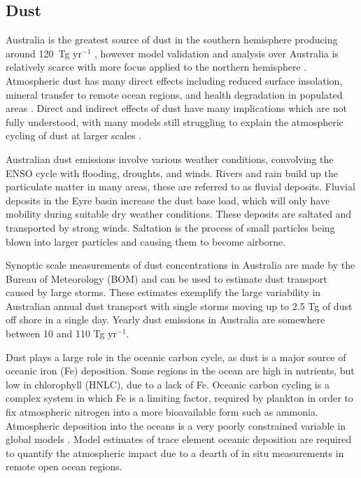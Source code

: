 \subsection{Dust}

Australia is the greatest source of dust in the southern hemisphere producing around 120~Tg yr$^{-1}$ \cite{Li_2008}, however model validation and analysis over Australia is relatively scarce with more focus applied to the northern hemisphere \cite{Duncan_Fairlie_2007,Ridley_2013}.
Atmospheric dust has many direct effects including reduced surface insolation, mineral transfer to remote ocean regions, and health degradation in populated areas \cite{Shao_2007}.
Direct and indirect effects of dust have many implications which are not fully understood, with many models still struggling to explain the atmospheric cycling of dust at larger scales \cite{Rotstayn_2011}.

Australian dust emissions involve various weather conditions, convolving the ENSO cycle with flooding, droughts, and winds.
Rivers and rain build up the particulate matter in many areas, these are referred to as fluvial deposits.
Fluvial deposits in the Eyre basin increase the dust base load, which will only have mobility during suitable dry weather conditions.
These deposits are saltated and transported by strong winds\cite{Zender_2003}.
Saltation is the process of small particles being blown into larger particles and causing them to become airborne.

Synoptic scale measurements of dust concentrations in Australia are made by the Bureau of Meteorology (BOM) and can be used to estimate dust transport caused by large storms. 
These estimates exemplify the large variability in Australian annual dust transport with single storms moving up to 2.5 Tg of dust off shore in a single day.
Yearly dust emissions in Australia are somewhere between 10 and 110 Tg yr$^{-1}$.

Dust plays a large role in the oceanic carbon cycle, as dust is a major source of oceanic iron (Fe) deposition.
Some regions in the ocean are high in nutrients, but low in chlorophyll (HNLC), due to a lack of Fe.
Oceanic carbon cycling is a complex system in which Fe is a limiting factor, required by plankton in order to fix atmospheric nitrogen into a more bioavailable form such as ammonia.
Atmospheric deposition into the oceans is a very poorly constrained variable in global models \cite{Grand_2015}.
Model estimates of trace element oceanic deposition are required to quantify the atmospheric impact due to a dearth of in situ measurements in remote open ocean regions.

